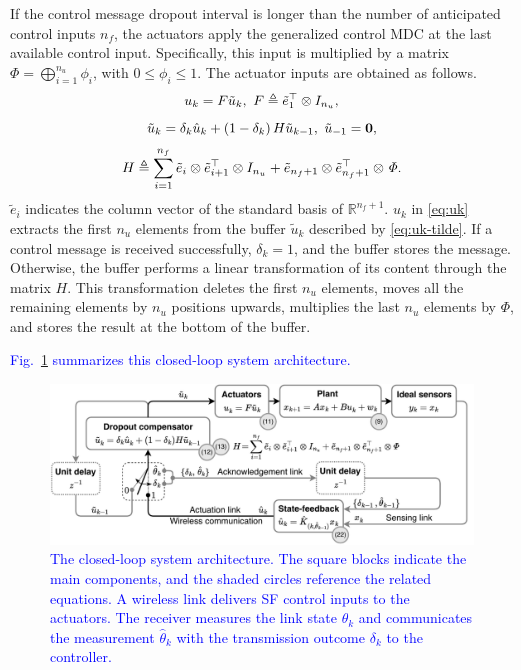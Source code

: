 \documentclass[journal,twoside,web]{ieeecolor}
\begin{document}
If the control message dropout interval is longer than the number of anticipated control inputs $n_f$, the actuators apply the generalized control MDC at the last available control input.  Specifically, this input is multiplied by a matrix $\mathit{\Phi}=\bigoplus_{i=1}^{n_u} \phi_i$, with $0 \leq \phi_i \leq 1$. 
The actuator inputs are obtained as follows.
\begin{equation}\label{eq:uk}
    \text{\small $u_k = F \tilde{u}_k,~F \triangleq \tilde{e}_{1}^{\top} \otimes I_{n_u},$}
\end{equation}
\begin{equation}\label{eq:uk-tilde}
    \text{\small $\tilde{u}_k = \delta_k \hat{u}_k + \left(1-\delta_k\right) H \tilde{u}_{k-1},~\tilde{u}_{-1} = \mathbf{0},$}
\end{equation}
\begin{equation}\label{eq:H}
    \text{\small $H \triangleq \sum_{i=1}^{n_f} \tilde{e}_{i} \otimes \tilde{e}_{i+1}^{\top} \otimes I_{n_u} + 
    \tilde{e}_{n_f+1} \otimes \tilde{e}_{n_f+1}^{\top} \otimes \mathit{\Phi}.$}
\end{equation}
$\tilde{e}_{i}$ indicates the column vector of the standard basis of $\mathbb{R}^{n_f+1}$.
$u_k$ in \eqref{eq:uk} extracts the first $n_u$ elements from the buffer $\tilde{u}_k$ described by \eqref{eq:uk-tilde}.
If a control message is received successfully, $\delta_k = 1$, and the buffer stores the message. Otherwise, the buffer performs a linear transformation of its content through the matrix $H$. This transformation deletes the first $n_u$ elements,  moves all the remaining elements by $n_u$ positions upwards, multiplies the last $n_u$ elements by $\mathit{\Phi}$, and stores the result at the bottom of the buffer. 

\textcolor{blue}{Fig.~\ref{fig:architecture} summarizes this closed-loop system architecture.}
\begin{figure}
\begin{center}
\vspace{5pt}\includegraphics[width=\columnwidth]{./wncs-lcss-cdc-25-architecture.pdf}\vspace{-4pt}
\caption{\textcolor{blue}{The closed-loop system architecture. The square blocks indicate the main components, and the shaded circles reference the related equations. A wireless link delivers SF control inputs to the actuators. The receiver measures the link state $\theta_k$ and communicates the measurement $\hat{\theta}_k$ with the transmission outcome $\delta_k$ to the controller.}}\label{fig:architecture}\vspace{-4pt}
\end{center}
\end{figure}
\end{document}
